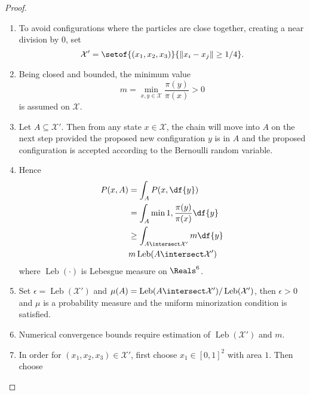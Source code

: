 \documentclass[12pt]{article}
\begin{document}
\begin{proof}
    \begin{enumerate}
        \item
            To avoid configurations where the particles are close
            together, creating a near division by \( 0 \), set
            \[
                \mathcal{X}' = \setof{(x_1,x_2,x_3)}{\| x_i - x_j \| \ge
                1/4}.
            \]
        \item
            Being closed and bounded, the minimum value
            \[
                m = \min_{x,y \in \mathcal{X}} \frac{\pi(y)}{\pi(x)} > 0
            \] is assumed on \( \mathcal{X} \).
        \item
            Let \( A \subseteq \mathcal{X}' \).  Then from any state \(
            x \in \mathcal{X} \), the chain will move into \( A \) on
            the next step provided the proposed new configuration \( y \)
            is in \( A \) and the proposed configuration is accepted
            according to the Bernoulli random variable.
        \item
            Hence
            \begin{align*}
                P(x,A) &= \int_A P(x,\df{y}) \\
                &= \int_A \min{1, \frac{\pi(y)}{\pi(x)}} \df{y} \\
                &\ge \int_{A \intersect \mathcal{X}'} m \df{y} \\
                & m
                \operatorname{Leb}
                (A \intersect \mathcal{X}')
            \end{align*}
            where \(
            \operatorname{Leb}
            (\cdot) \) is Lebesgue measure on \( \Reals^6 \).
        \item
            Set \( \epsilon =
            \operatorname{Leb}
            (\mathcal{X}') \) and \( \mu(A) =
            \operatorname{Leb}
            (A \intersect \mathcal{X}')/
            \operatorname{Leb}
            (\mathcal{X}') \), then \( \epsilon > 0 \) and \( \mu \) is
            a probability measure and the uniform minorization condition
            is satisfied.
        \item
            Numerical convergence bounds require estimation of \(
            \operatorname{Leb}
            (\mathcal{X}') \) and \( m \).
        \item
            In order for \( (x_1,x_2,x_3) \in \mathcal{X}' \), first
            choose \( x_1 \in [0,1]^2 \) with area \( 1 \).  Then choose

\end{enumerate}
\end{proof}
\end{document}
